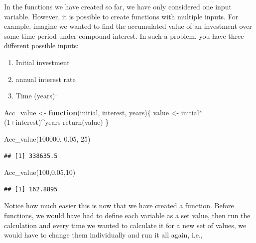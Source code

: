 \documentclass[
]{book}
\newenvironment{Shaded}{\begin{snugshade}}{\end{snugshade}}
\newcommand{\ControlFlowTok}[1]{\textcolor[rgb]{0.13,0.29,0.53}{\textbf{#1}}}
\newcommand{\DecValTok}[1]{\textcolor[rgb]{0.00,0.00,0.81}{#1}}
\newcommand{\FloatTok}[1]{\textcolor[rgb]{0.00,0.00,0.81}{#1}}
\newcommand{\FunctionTok}[1]{\textcolor[rgb]{0.00,0.00,0.00}{#1}}
\newcommand{\NormalTok}[1]{#1}
\newcommand{\OtherTok}[1]{\textcolor[rgb]{0.56,0.35,0.01}{#1}}
\newcommand{\SpecialCharTok}[1]{\textcolor[rgb]{0.00,0.00,0.00}{#1}}
\providecommand{\tightlist}{%
  \setlength{\itemsep}{0pt}\setlength{\parskip}{0pt}}
\theoremstyle{definition}
\theoremstyle{definition}
\theoremstyle{definition}
\theoremstyle{definition}
\theoremstyle{remark}
\begin{document}
In the functions we have created so far, we have only considered one input variable. However, it is possible to create functions with multiple inputs. For example, imagine we wanted to find the accumulated value of an investment over some time period under compound interest. In such a problem, you have three different possible inputs:

\begin{enumerate}
\def\labelenumi{\arabic{enumi}.}
\tightlist
\item
  Initial investment
\item
  annual interest rate
\item
  Time (years):
\end{enumerate}

\begin{Shaded}
\begin{Highlighting}[]
\NormalTok{Acc\_value }\OtherTok{\textless{}{-}} \ControlFlowTok{function}\NormalTok{(initial, interest, years)\{}
\NormalTok{  value }\OtherTok{\textless{}{-}}\NormalTok{ initial}\SpecialCharTok{*}\NormalTok{(}\DecValTok{1}\SpecialCharTok{+}\NormalTok{interest)}\SpecialCharTok{\^{}}\NormalTok{years}
  \FunctionTok{return}\NormalTok{(value)}
\NormalTok{\}}

\FunctionTok{Acc\_value}\NormalTok{(}\DecValTok{100000}\NormalTok{, }\FloatTok{0.05}\NormalTok{, }\DecValTok{25}\NormalTok{) }
\end{Highlighting}
\end{Shaded}

\begin{verbatim}
## [1] 338635.5
\end{verbatim}

\begin{Shaded}
\begin{Highlighting}[]
\FunctionTok{Acc\_value}\NormalTok{(}\DecValTok{100}\NormalTok{,}\FloatTok{0.05}\NormalTok{,}\DecValTok{10}\NormalTok{)}
\end{Highlighting}
\end{Shaded}

\begin{verbatim}
## [1] 162.8895
\end{verbatim}

Notice how much easier this is now that we have created a function. Before functions, we would have had to define each variable as a set value, then run the calculation and every time we wanted to calculate it for a new set of values, we would have to change them individually and run it all again, i.e.,
\end{document}
